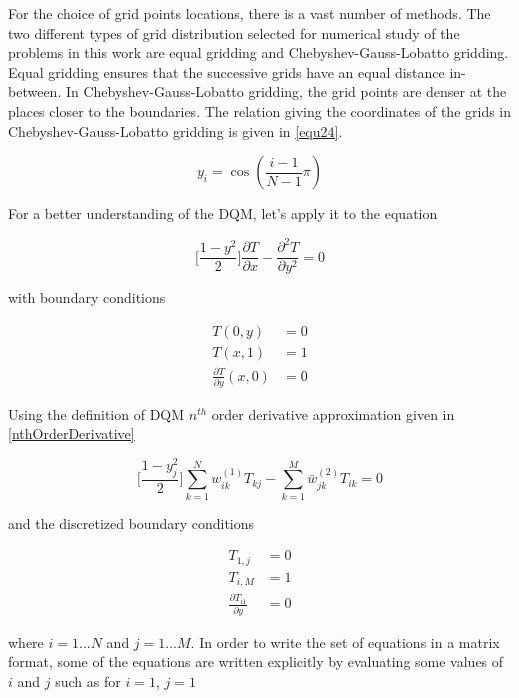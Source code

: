 For the choice of grid points locations, there is a vast number of methods. The two different types of grid distribution selected for numerical study of the problems in this work are equal gridding and Chebyshev-Gauss-Lobatto gridding. Equal gridding ensures that the successive grids have an equal distance in-between. In Chebyshev-Gauss-Lobatto gridding, the grid points are denser at the places closer to the boundaries. The relation giving the coordinates of the grids in Chebyshev-Gauss-Lobatto gridding is given in \eqref{equ24}. 

\begin{equation} \label{equ24}
{{y}_{i}}=\cos \left( \frac{i-1}{N-1}\pi  \right)
\end{equation}

For a better understanding of the DQM, let's apply it to the equation

\begin{equation} \label{DQMApplyExample}
\bigg[\frac{1-y^2}{2} \bigg] \frac{\partial T}{\partial x} -\frac{\partial^2T}{\partial y^2} = 0
\end{equation}

with boundary conditions

\begin{align}
T(0,y)&=0 \label{boundaryCond1} \\
T(x,1)&=1 \label{boundaryCond2} \\
\frac{\partial T}{\partial y}(x,0)&=0 \label{boundaryCond2} 
\end{align}

Using the definition of DQM $n^{th}$ order derivative approximation given in  \eqref{nthOrderDerivative}

\begin{equation} \label{DQMApplyExampleDiscretized}
\bigg[\frac{1-y_j^2}{2} \bigg] \sum_{k=1}^N w_{ik}^{(1)} T_{kj} - \sum_{k=1}^M \bar{w}_{jk}^{(2)} T_{ik} = 0
\end{equation}

and the discretized boundary conditions

\begin{align}
T_{1,j}&=0 \label{discretizedBoundaryCond1} \\
T_{i,M}&=1\label{discretizedBoundaryCond2} \\ 
\frac{\partial T_{i1}}{\partial y}&=0 \label{discretizedBoundaryCond3}
\end{align}

where $i = 1 ... N$ and $j = 1 ... M$. In order to write the set of equations in a matrix format, some of the equations are written explicitly by evaluating some values of $i$ and $j$ such as for $i=1$, $j=1$

